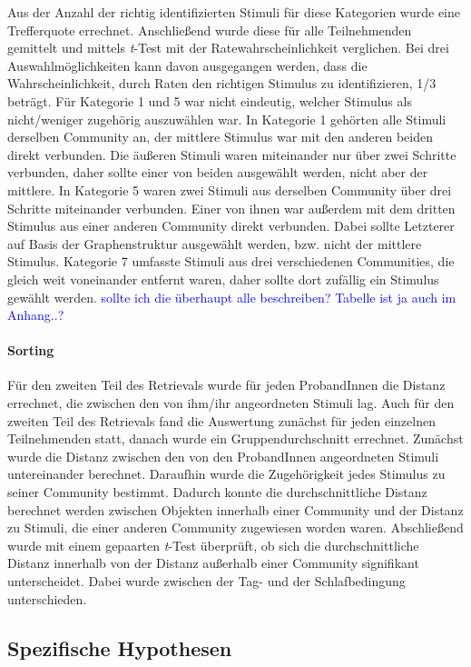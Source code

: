 Aus der Anzahl der richtig identifizierten Stimuli für diese Kategorien wurde eine Trefferquote errechnet. Anschließend wurde diese für alle Teilnehmenden gemittelt und mittels \textit{t}-Test mit der Ratewahrscheinlichkeit verglichen. Bei drei Auswahlmöglichkeiten kann davon ausgegangen werden, dass die Wahrscheinlichkeit, durch Raten den richtigen Stimulus zu identifizieren, 1/3 beträgt.
Für Kategorie 1 und 5 war nicht eindeutig, welcher Stimulus als nicht/weniger zugehörig auszuwählen war. In Kategorie 1 gehörten alle Stimuli derselben Community an, der mittlere Stimulus war mit den anderen beiden direkt verbunden. Die äußeren Stimuli waren miteinander nur über zwei Schritte verbunden, daher sollte einer von beiden ausgewählt werden, nicht aber der mittlere.
In Kategorie 5 waren zwei Stimuli aus derselben Community über drei Schritte miteinander verbunden. Einer von ihnen war außerdem mit dem dritten Stimulus aus einer anderen Community direkt verbunden. Dabei sollte Letzterer auf Basis der Graphenstruktur ausgewählt werden, bzw. nicht der mittlere Stimulus.
Kategorie 7 umfasste Stimuli aus drei verschiedenen Communities, die gleich weit voneinander entfernt waren, daher sollte dort zufällig ein Stimulus gewählt werden.
\textcolor{blue}{sollte ich die überhaupt alle beschreiben? Tabelle ist ja auch im Anhang..?}

\paragraph{Sorting}
Für den zweiten Teil des Retrievals wurde für jeden ProbandInnen die Distanz errechnet, die zwischen den von ihm/ihr angeordneten Stimuli lag.
Auch für den zweiten Teil des Retrievals fand die Auswertung zunächst für jeden einzelnen Teilnehmenden statt, danach wurde ein Gruppendurchschnitt errechnet. Zunächst wurde die Distanz zwischen den von den ProbandInnen angeordneten Stimuli untereinander berechnet. Daraufhin wurde die Zugehörigkeit jedes Stimulus zu seiner Community bestimmt. Dadurch konnte die durchschnittliche Distanz berechnet werden zwischen Objekten innerhalb einer Community und der Distanz zu Stimuli, die einer anderen Community zugewiesen worden waren. Abschließend wurde mit einem gepaarten \textit{t}-Test überprüft, ob sich die durchschnittliche Distanz innerhalb von der Distanz außerhalb einer Community signifikant unterscheidet. Dabei wurde zwischen der Tag- und der Schlafbedingung unterschieden.

\subsection{Spezifische Hypothesen}

